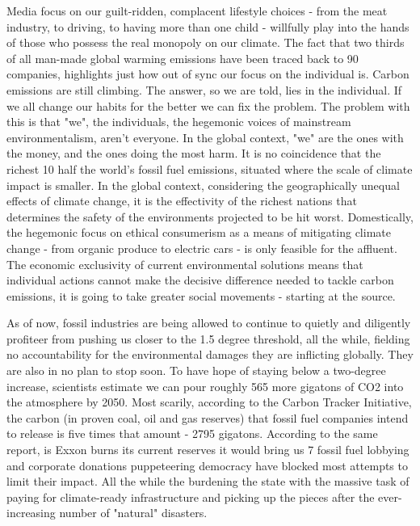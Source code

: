    Media focus on our guilt-ridden, complacent lifestyle choices - from
   the meat industry, to driving, to having more than one child -
   willfully play into the hands of those who possess the real monopoly on
   our climate. The fact that two thirds of all man-made global warming
   emissions have been traced back to 90 companies, highlights just how
   out of sync our focus on the individual is. Carbon emissions are still
   climbing. The answer, so we are told, lies in the individual. If we all
   change our habits for the better we can fix the problem. The problem
   with this is that "we", the individuals, the hegemonic voices of
   mainstream environmentalism, aren't everyone. In the global context,
   "we" are the ones with the money, and the ones doing the most harm. It
   is no coincidence that the richest 10%
   half the world's fossil fuel emissions, situated where the scale of
   climate impact is smaller. In the global context, considering the
   geographically unequal effects of climate change, it is the effectivity
   of the richest nations that determines the safety of the environments
   projected to be hit worst. Domestically, the hegemonic focus on ethical
   consumerism as a means of mitigating climate change - from organic
   produce to electric cars - is only feasible for the affluent. The
   economic exclusivity of current environmental solutions means that
   individual actions cannot make the decisive difference needed to tackle
   carbon emissions, it is going to take greater social movements -
   starting at the source.

   As of now, fossil industries are being allowed to continue to quietly
   and diligently profiteer from pushing us closer to the 1.5 degree
   threshold, all the while, fielding no accountability for the
   environmental damages they are inflicting globally. They are also in no
   plan to stop soon. To have hope of staying below a two-degree increase,
   scientists estimate we can pour roughly 565 more gigatons of CO2 into
   the atmosphere by 2050. Most scarily, according to the Carbon Tracker
   Initiative, the carbon (in proven coal, oil and gas reserves) that
   fossil fuel companies intend to release is five times that amount -
   2795 gigatons. According to the same report, is Exxon burns its current
   reserves it would bring us 7%
   fossil fuel lobbying and corporate donations puppeteering democracy
   have blocked most attempts to limit their impact. All the while the
   burdening the state with the massive task of paying for climate-ready
   infrastructure and picking up the pieces after the ever-increasing
   number of "natural" disasters.

